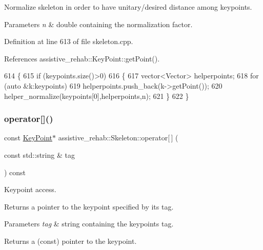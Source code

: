 Normalize skeleton in order to have unitary/desired distance among keypoints. 


\begin{DoxyParams}{Parameters}
{\em n} & double containing the normalization factor. \\
\hline
\end{DoxyParams}


Definition at line 613 of file skeleton.\+cpp.



References assistive\+\_\+rehab\+::\+Key\+Point\+::get\+Point().


\begin{DoxyCode}
614 \{
615     \textcolor{keywordflow}{if} (keypoints.size()>0)
616     \{
617         vector<Vector> helperpoints;
618         \textcolor{keywordflow}{for} (\textcolor{keyword}{auto} &k:keypoints)
619             helperpoints.push\_back(k->getPoint());
620         helper\_normalize(keypoints[0],helperpoints,n);
621     \}
622 \}
\end{DoxyCode}
\mbox{\label{classassistive__rehab_1_1Skeleton_a3ecc7418af653c88e40d41bb379b7271}} 
\subsubsection{\texorpdfstring{operator[]()}{operator[]()}\hspace{0.1cm}{\footnotesize\ttfamily [1/2]}}
{\footnotesize\ttfamily const \hyperlink{classassistive__rehab_1_1KeyPoint}{Key\+Point}$\ast$ assistive\+\_\+rehab\+::\+Skeleton\+::operator\mbox{[}$\,$\mbox{]} (\begin{DoxyParamCaption}\item[{const std\+::string \&}]{tag }\end{DoxyParamCaption}) const}



Keypoint access. 

Returns a pointer to the keypoint specified by its tag. 
\begin{DoxyParams}{Parameters}
{\em tag} & string containing the keypoint\textquotesingle{}s tag. \\
\hline
\end{DoxyParams}
\begin{DoxyReturn}{Returns}
a (const) pointer to the keypoint. 
\end{DoxyReturn}


